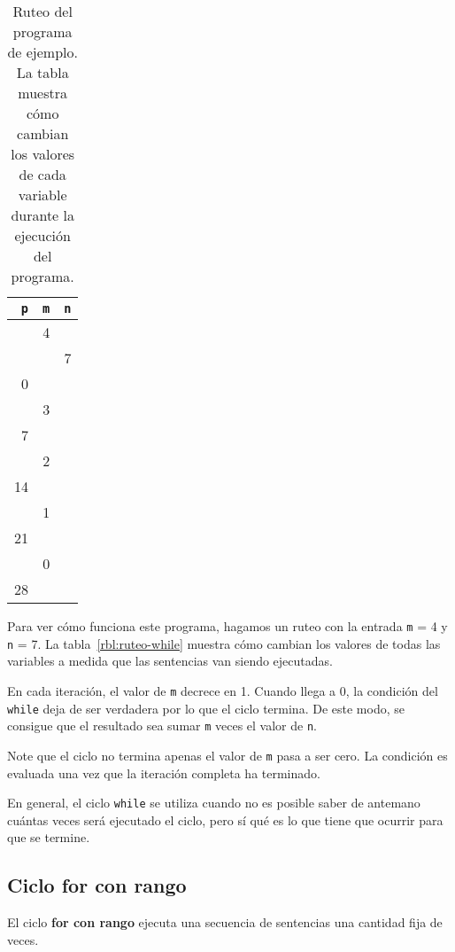\begin{table}
  \centering
  \begin{tabular}{*{3}{r}}
    \toprule
      \lstinline!p! & \lstinline!m! & \lstinline!n! \\
    \midrule
         &  4 &   \\
         &    & 7 \\
       0 &    &   \\
         &  3 &   \\
       7 &    &   \\
         &  2 &   \\
      14 &    &   \\
         &  1 &   \\
      21 &    &   \\
         &  0 &   \\
      28 &    &   \\
    \bottomrule
  \end{tabular}
  \caption{%
    Ruteo del programa de ejemplo.
    La tabla muestra cómo cambian los valores de cada variable
    durante la ejecución del programa.
  }
  \label{tbl:ruteo-while}
\end{table}

Para ver cómo funciona este programa, hagamos un ruteo con la entrada
\lstinline!m! = 4 y \lstinline!n! = 7.
La tabla~\ref{rbl:ruteo-while} muestra cómo cambian
los valores de todas las variables
a medida que las sentencias van siendo ejecutadas.

En cada iteración, el valor de \lstinline!m! decrece en 1. Cuando llega
a 0, la condición del \lstinline!while! deja de ser verdadera por lo que
el ciclo termina. De este modo, se consigue que el resultado sea sumar
\lstinline!m! veces el valor de \lstinline!n!.

Note que el ciclo no termina apenas el valor de \lstinline!m! pasa a ser
cero. La condición es evaluada una vez que la iteración completa ha
terminado.

En general, el ciclo \lstinline!while! se utiliza cuando no es posible
saber de antemano cuántas veces será ejecutado el ciclo, pero sí qué es
lo que tiene que ocurrir para que se termine.

\subsection{Ciclo for con rango}

El ciclo \textbf{for con rango} ejecuta una secuencia de sentencias una
cantidad fija de veces.

